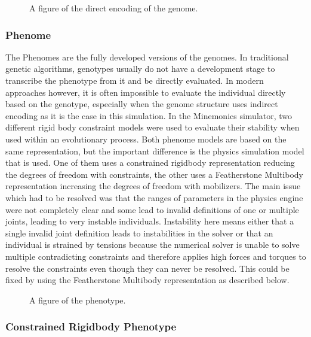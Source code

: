 \documentclass[main]{subfiles}
\begin{document}
\begin{figure}[H]
\centering


\caption[Directly encoded genome]{A figure of the direct encoding of the genome.}
\label{figure:direct-encoding}
\end{figure}

\subsubsection{Phenome}

The Phenomes are the fully developed versions of the genomes. In traditional genetic algorithms, genotypes usually do not have a development stage to transcribe the phenotype from it and be directly evaluated. In modern approaches however, it is often impossible to evaluate the individual directly based on the genotype, especially when the genome structure uses indirect encoding as it is the case in this simulation.
In the Minemonics simulator, two different rigid body constraint models were used to evaluate their stability when used within an evolutionary process. Both phenome models are based on the same representation, but the important difference is the physics simulation model that is used. One of them uses a constrained rigidbody representation reducing the degrees of freedom with constraints, the other uses a Featherstone Multibody representation increasing the degrees of freedom with mobilizers. The main issue which had to be resolved was that the ranges of parameters in the physics engine were not completely clear and some lead to invalid definitions of one or multiple joints, leading to very instable individuals. Instability here means either that a single invalid joint definition leads to instabilities in the solver or that an individual is strained by tensions because the numerical solver is unable to solve multiple contradicting constraints and therefore applies high forces and torques to resolve the constraints even though they can never be resolved. This could be fixed by using the Featherstone Multibody representation as described below. 

\begin{figure}[H]
\centering


\caption[A figure of the phenotype]{A figure of the phenotype.}
\label{figure:direct-encoding}
\end{figure}

\subsubsection{Constrained Rigidbody Phenotype}
\end{document}
